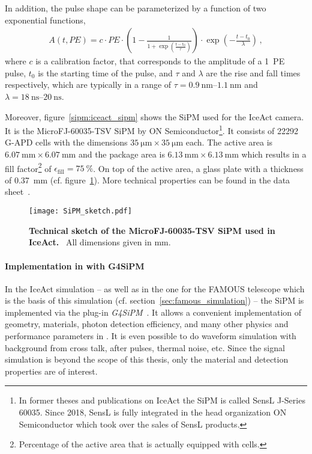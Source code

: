 In addition, the pulse shape can be parameterized by a function of two exponential functions,
\begin{align}
	A(t,PE) = c\cdot PE \cdot \left(1-\frac{1}{1+\exp\left(\frac{t-t_0}{\tau}\right)}\right)\cdot\exp\left(-\frac{t-t_0}{\lambda}\right)\,,
\end{align}
where $c$ is a calibration factor, that corresponds to the amplitude of a \SI{1}{PE} pulse, $t_0$ is the starting time of the pulse, and $\tau$ and $\lambda$ are the rise and fall times respectively, which are typically in a range of $\tau=\SIrange{0.9}{1.1}{\nano\meter}$ and $\lambda=\SIrange{18}{20}{\nano\second}$.~\cite{sipm:fact_calibration}

Moreover, figure~\ref{sipm:iceact_sipm} shows the SiPM used for the IceAct camera. It is the MicroFJ-60035-TSV SiPM by ON Semiconductor\footnote{In former theses and publications on IceAct the SiPM is called SensL J-Series 60035. Since 2018, SensL is fully integrated in the head organization ON Semiconductor which took over the sales of SensL products.}. 
It consists of \num{22292} G-APD cells with the dimensions $\SI{35}{\micro\meter}\times\SI{35}{\micro\meter}$ each. The active area is $\SI{6.07}{\milli\meter}\times\SI{6.07}{\milli\meter}$ and the package area is $\SI{6.13}{\milli\meter}\times\SI{6.13}{\milli\meter}$ which results in a fill factor\footnote{Percentage of the active area that is actually equipped with cells.} of $\epsilon_\text{fill}=\SI{75}{\percent}$. On top of the active area, a glass plate with a thickness of \SI{0.37}{\milli\meter} (cf. figure~\ref{sipm:tec_sketch}). More technical properties can be found in the data sheet~\cite{sipm:datasheet}.

\begin{figure}[H]
	\centering
	\texttt{[image: SiPM\_sketch.pdf]}
	\caption[Technical sketch of the MicroFJ-60035-TSV SiPM used in IceAct]{\textbf{Technical sketch of the MicroFJ-60035-TSV SiPM used in IceAct.}~\cite{sipm:datasheet} All dimensions given in \si{\milli\meter}.}
	\label{sipm:tec_sketch}	
\end{figure}

\paragraph{Implementation in \geant with G4SiPM}

In the IceAct \geant simulation -- as well as in the one for the FAMOUS telescope which is the basis of this simulation (cf. section~\ref{sec:famous_simulation}) -- the SiPM is implemented via the plug-in \textit{G4SiPM}~\cite{sipm:g4sipm}. It allows a convenient implementation of geometry, materials, photon detection efficiency, and many other physics and performance parameters in \geant. It is even possible to do waveform simulation with background from cross talk, after pulses, thermal noise, etc. Since the signal simulation is beyond the scope of this thesis, only the material and detection properties are of interest.

